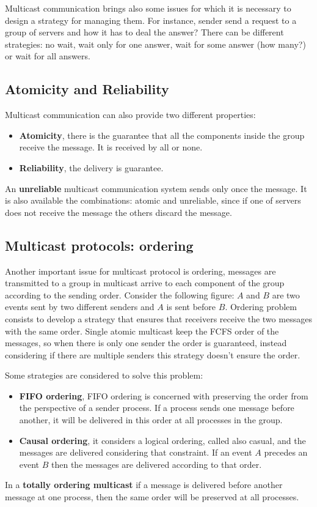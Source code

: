 \documentclass[11pt,a4paper]{article}
\begin{document}
Multicast communication brings also some issues for which it is necessary to design a strategy for managing them. For instance, sender send a request to a group of servers and how it has to deal the answer? There can be different strategies: no wait, wait only for one answer, wait for some answer (how many?) or wait for all answers. 

\subsection{Atomicity and Reliability}
Multicast communication can also provide two different properties:
\begin{itemize}
	\item \textbf{Atomicity}, there is the guarantee that all the components inside the group receive the message. It is received by all or none.
	\item \textbf{Reliability}, the delivery is guarantee.
\end{itemize}
An \textbf{unreliable} multicast communication system sends only once the message. It is also available the combinations: atomic and unreliable, since if one of servers does not receive the message the others discard the message.

\subsection{Multicast protocols: ordering} 
Another important issue for multicast protocol is ordering, messages are transmitted to a group in multicast arrive to each component of the group according to the sending order.
Consider the following figure:
$A$ and $B$ are two events sent by two different senders and $A$ is sent before $B$. Ordering problem consists to develop a strategy that ensures that receivers receive the two messages with the same order.
Single atomic multicast keep the FCFS order of the messages, so when there is only one sender the order is guaranteed, instead considering if there are multiple senders this strategy doesn't ensure the order.

Some strategies are considered to solve this problem:
\begin{itemize}
	\item \textbf{FIFO ordering}, FIFO ordering is concerned with preserving the order from the perspective of a sender process. If a process sends one message before another, it will be delivered in
	this order at all processes in the group.
	\item \textbf{Causal ordering}, it considers a logical ordering, called also casual, and the messages are delivered considering that constraint. If an event $A$ precedes an event $B$ then the messages are delivered according to that order.
\end{itemize}
In a \textbf{totally ordering multicast} if a message is delivered before another message at one process, then the same order will be preserved at all processes.
\end{document}
